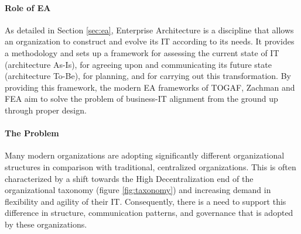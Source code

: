 
\paragraph*{Role of EA}

As detailed in Section \ref{sec:ea}, Enterprise Architecture is a discipline that allows an organization to construct and evolve its IT according to its needs. It provides a methodology and sets up a framework for assessing the current state of IT (architecture As-Is), for agreeing upon and communicating its future state (architecture To-Be), for planning, and for carrying out this transformation. By providing this framework, the modern EA frameworks of TOGAF, Zachman and FEA aim to solve the problem of business-IT alignment from the ground up through proper design. 

\paragraph*{The Problem} 

Many modern organizations are adopting significantly different organizational structures in comparison with traditional, centralized organizations. This is often characterized by a shift towards the High Decentralization end of the organizational taxonomy (figure \ref{fig:taxonomy}) and increasing demand in flexibility and agility of their IT. Consequently, there is a need to support this difference in structure, communication patterns, and governance that is adopted by these organizations.

%


